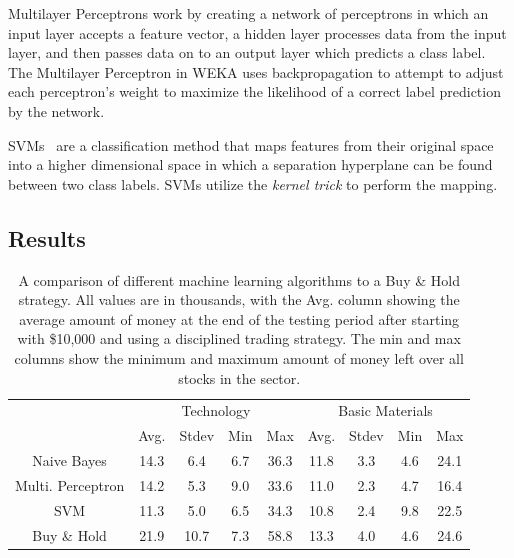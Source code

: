 \documentclass[10pt]{article}
\begin{document}
Multilayer Perceptrons work by creating a network of perceptrons in which an
input layer accepts a feature vector, a hidden layer processes data from the
input layer, and then passes data on to an output layer which predicts a class
label. The Multilayer Perceptron in WEKA uses backpropagation to attempt to
adjust each perceptron's weight to maximize the likelihood of a correct label
prediction by the network.

SVMs~\cite{vapnik2006estimation} are a classification method that maps features from
their original space into a higher dimensional space in which a separation
hyperplane can be found between two class labels. SVMs utilize the \emph{kernel
trick} to perform the mapping.


\subsection{Results} 
\label{sec:slresults}

\begin{table}
    \begin{center}
    \begin{tabular}{|c|c|c|c|c||c|c|c|c|}
        \hline
        \multirow{2}{*}{} & \multicolumn{4}{c||}{Technology} & \multicolumn{4}{c|}{Basic Materials} \\
        \cline{2-9}
                        & Avg. & Stdev & Min & Max & Avg. & Stdev & Min & Max\\
        \hline
        Naive Bayes & 14.3 & 6.4 & 6.7 & 36.3 & 11.8 & 3.3 & 4.6 & 24.1 \\
        \hline
        Multi. Perceptron & 14.2 & 5.3 & 9.0 & 33.6 & 11.0 & 2.3 & 4.7 & 16.4 \\
        \hline
        SVM & 11.3 & 5.0 & 6.5 & 34.3 & 10.8 & 2.4 & 9.8 & 22.5 \\
        \hline
        Buy \& Hold & 21.9 & 10.7 & 7.3 & 58.8 & 13.3 & 4.0 & 4.6 & 24.6 \\
        \hline
    \end{tabular}
    \end{center}
    \vspace{-0.5cm}
    \caption{A comparison of different machine learning algorithms to a Buy \&
    Hold strategy. All values are in thousands, with the Avg. column showing
    the average amount of money at the end of the testing period after starting
    with \$10,000 and using a disciplined trading strategy. The min and max
    columns show the minimum and maximum amount of money left over all stocks
    in the sector.}

    \label{tab:testresults}
    \vspace{-0.1cm}
\end{table}
\end{document}
